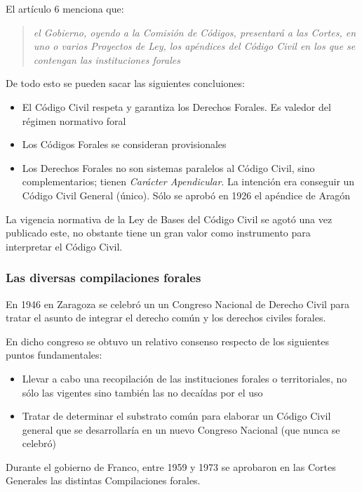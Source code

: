 \documentclass[a4paper,12pt]{report}
\begin{document}
El artículo 6 menciona que:

\begin{quote}
    \textit{el Gobierno, oyendo a la Comisión de Códigos, presentará a las
        Cortes, en uno o varios Proyectos de Ley, los apéndices del Código Civil
    en los que se contengan las instituciones forales}
\end{quote}

De todo esto se pueden sacar las siguientes concluiones:

\begin{itemize}
\item{El Código Civil respeta y garantiza los Derechos Forales. Es valedor del
    régimen normativo foral}
\item{Los Códigos Forales se consideran provisionales}
\item{Los Derechos Forales no son sistemas paralelos al Código Civil, sino
    complementarios; tienen \emph{Carácter Apendicular}. La intención era
conseguir un Código Civil General (único). Sólo se aprobó en 1926 el apéndice de
Aragón}
\end{itemize}

La vigencia normativa de la Ley de Bases del Código Civil se agotó una vez
publicado este, no obstante tiene un gran valor como instrumento para
interpretar el Código Civil.

\subsubsection{Las diversas compilaciones forales}

En 1946 en Zaragoza se celebró un un Congreso Nacional de Derecho Civil para
tratar el asunto de integrar el derecho común y los derechos civiles forales.

En dicho congreso se obtuvo un relativo consenso respecto de los siguientes
puntos fundamentales:

\begin{itemize}
\item{Llevar a cabo una recopilación de las instituciones forales o
    territoriales, no sólo las vigentes sino también las no decaídas por el uso}
\item{Tratar de determinar el substrato común para elaborar un Código Civil
    general que se desarrollaría en un nuevo Congreso Nacional (que nunca se
celebró)}
\end{itemize}

Durante el gobierno de Franco, entre 1959 y 1973 se aprobaron en las Cortes Generales las distintas
Compilaciones forales.
\end{document}

